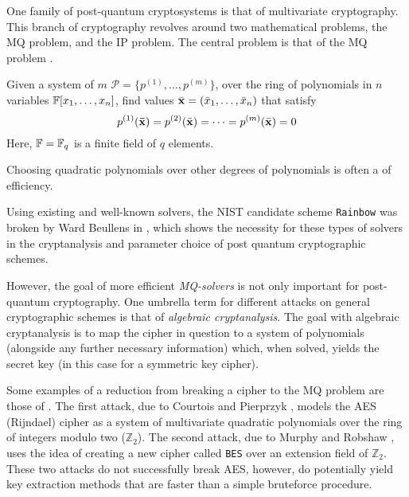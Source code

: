 One family of post-quantum cryptosystems is that of multivariate cryptography. This branch of cryptography revolves around two mathematical problems, the MQ problem, and the IP problem. The central problem is that of the MQ problem \cite{Ding2020}.

\begin{defn}\label{sec1:def:mq}
Given a system of $m$  $\mathcal{P} = \{p^{(1)}, \dots, p^{(m)}\}$, over the ring of polynomials in $n$ variables $\mathbb{F}[x_1, \dots, x_n]$, find values $\Bar{\mathbf{x}} = (\Bar{x}_1, \dots, \Bar{x}_n)$ that satisfy
$$
    p^{(1)}(\mathbf{\Bar{\mathbf{x}}}) =  p^{(2)}(\Bar{\mathbf{x}}) = \dots = p^{(m)}(\Bar{\mathbf{x}}) = 0 
$$
Here, $\mathbb{F} = \mathbb{F}_q$ is a finite field of $q$ elements. 
\end{defn}

Choosing quadratic polynomials over other degrees of polynomials is often a  of efficiency.


 Using existing and well-known solvers, the NIST candidate scheme \texttt{Rainbow} was broken by Ward Beullens in \cite{crypto-2022-32130}, which shows the necessity for these types of solvers in the cryptanalysis and parameter choice of post quantum cryptographic schemes.

However, the goal of more efficient \textit{MQ-solvers} is not only important for post-quantum cryptography. One umbrella term for different attacks on general cryptographic schemes is that of \textit{algebraic cryptanalysis}. The goal with algebraic cryptanalysis is to map the cipher in question to a system of polynomials (alongside any further necessary information) which, when solved, yields the secret key (in this case for a symmetric key cipher).

Some examples of a reduction from breaking a cipher to the MQ problem are those of \cite{nover2005algebraic}. The first attack, due to Courtois and Pierprzyk \cite{courtois2002cryptanalysis}, models the AES (Rijndael) cipher as a system of multivariate quadratic polynomials over the ring of integers modulo two ($\mathbb{Z}_2$). The second attack, due to Murphy and Robshaw \cite{crypto-2002-1565}, uses the idea of creating a new cipher called \texttt{BES} over an extension field of $\mathbb{Z}_2$. These two attacks do not successfully break AES, however, do potentially yield key extraction methods that are faster than a simple bruteforce procedure.

